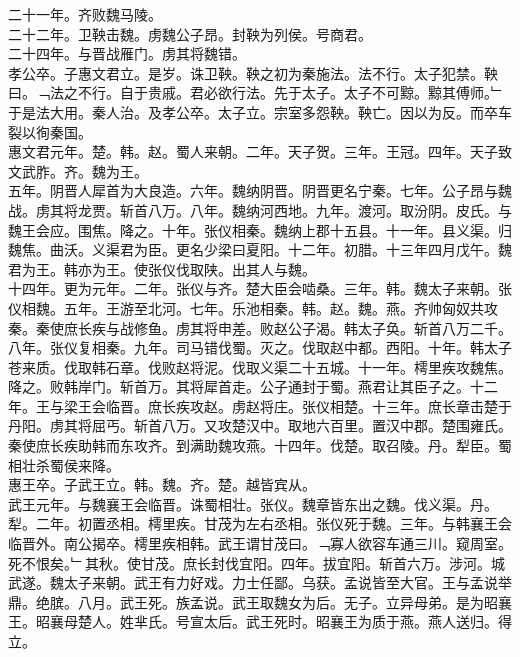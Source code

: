\documentclass{zhvt-classic}
\begin{document}
\hspace*{2em}二十一年。齐败魏马陵。\\
\hspace*{2em}二十二年。卫鞅击魏。虏魏公子昂。封鞅为列侯。号商君。\\
\hspace*{2em}二十四年。与晋战雁门。虏其将魏错。\\
\hspace*{2em}孝公卒。子惠文君立。是岁。诛卫鞅。鞅之初为秦施法。法不行。太子犯禁。鞅曰。﹁法之不行。自于贵戚。君必欲行法。先于太子。太子不可黥。黥其傅师。﹂于是法大用。秦人治。及孝公卒。太子立。宗室多怨鞅。鞅亡。因以为反。而卒车裂以徇秦国。\\
\hspace*{2em}惠文君元年。楚。韩。赵。蜀人来朝。二年。天子贺。三年。王冠。四年。天子致文武胙。齐。魏为王。\\
\hspace*{2em}五年。阴晋人犀首为大良造。六年。魏纳阴晋。阴晋更名宁秦。七年。公子昂与魏战。虏其将龙贾。斩首八万。八年。魏纳河西地。九年。渡河。取汾阴。皮氏。与魏王会应。围焦。降之。十年。张仪相秦。魏纳上郡十五县。十一年。县义渠。归魏焦。曲沃。义渠君为臣。更名少梁曰夏阳。十二年。初腊。十三年四月戊午。魏君为王。韩亦为王。使张仪伐取陕。出其人与魏。\\
\hspace*{2em}十四年。更为元年。二年。张仪与齐。楚大臣会啮桑。三年。韩。魏太子来朝。张仪相魏。五年。王游至北河。七年。乐池相秦。韩。赵。魏。燕。齐帅匈奴共攻秦。秦使庶长疾与战修鱼。虏其将申差。败赵公子渴。韩太子奂。斩首八万二千。八年。张仪复相秦。九年。司马错伐蜀。灭之。伐取赵中都。西阳。十年。韩太子苍来质。伐取韩石章。伐败赵将泥。伐取义渠二十五城。十一年。樗里疾攻魏焦。降之。败韩岸门。斩首万。其将犀首走。公子通封于蜀。燕君让其臣子之。十二年。王与梁王会临晋。庶长疾攻赵。虏赵将庄。张仪相楚。十三年。庶长章击楚于丹阳。虏其将屈丐。斩首八万。又攻楚汉中。取地六百里。置汉中郡。楚围雍氏。秦使庶长疾助韩而东攻齐。到满助魏攻燕。十四年。伐楚。取召陵。丹。犁臣。蜀相壮杀蜀侯来降。\\
\hspace*{2em}惠王卒。子武王立。韩。魏。齐。楚。越皆宾从。\\
\hspace*{2em}武王元年。与魏襄王会临晋。诛蜀相壮。张仪。魏章皆东出之魏。伐义渠。丹。犁。二年。初置丞相。樗里疾。甘茂为左右丞相。张仪死于魏。三年。与韩襄王会临晋外。南公揭卒。樗里疾相韩。武王谓甘茂曰。﹁寡人欲容车通三川。窥周室。死不恨矣。﹂其秋。使甘茂。庶长封伐宜阳。四年。拔宜阳。斩首六万。涉河。城武遂。魏太子来朝。武王有力好戏。力士任鄙。乌获。孟说皆至大官。王与孟说举鼎。绝膑。八月。武王死。族孟说。武王取魏女为后。无子。立异母弟。是为昭襄王。昭襄母楚人。姓芈氏。号宣太后。武王死时。昭襄王为质于燕。燕人送归。得立。\\
\end{document}
